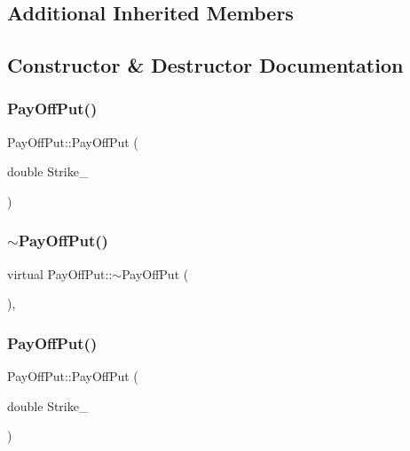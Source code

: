 \subsection*{Additional Inherited Members}


\subsection{Constructor \& Destructor Documentation}
\hypertarget{classPayOffPut_a56cbaf3c01a4bed8a64d71f1a6c0eb1f}{}\label{classPayOffPut_a56cbaf3c01a4bed8a64d71f1a6c0eb1f} 
\subsubsection{\texorpdfstring{Pay\+Off\+Put()}{PayOffPut()}\hspace{0.1cm}{\footnotesize\ttfamily [1/3]}}
{\footnotesize\ttfamily Pay\+Off\+Put\+::\+Pay\+Off\+Put (\begin{DoxyParamCaption}\item[{double}]{Strike\+\_\+ }\end{DoxyParamCaption})}

\hypertarget{classPayOffPut_abe98c70df681b36063f59671fc2877f6}{}\label{classPayOffPut_abe98c70df681b36063f59671fc2877f6} 
\subsubsection{\texorpdfstring{$\sim$\+Pay\+Off\+Put()}{~PayOffPut()}\hspace{0.1cm}{\footnotesize\ttfamily [1/2]}}
{\footnotesize\ttfamily virtual Pay\+Off\+Put\+::$\sim$\+Pay\+Off\+Put (\begin{DoxyParamCaption}{ }\end{DoxyParamCaption})\hspace{0.3cm}{\ttfamily [inline]}, {\ttfamily [virtual]}}

\hypertarget{classPayOffPut_a56cbaf3c01a4bed8a64d71f1a6c0eb1f}{}\label{classPayOffPut_a56cbaf3c01a4bed8a64d71f1a6c0eb1f} 
\subsubsection{\texorpdfstring{Pay\+Off\+Put()}{PayOffPut()}\hspace{0.1cm}{\footnotesize\ttfamily [2/3]}}
{\footnotesize\ttfamily Pay\+Off\+Put\+::\+Pay\+Off\+Put (\begin{DoxyParamCaption}\item[{double}]{Strike\+\_\+ }\end{DoxyParamCaption})}

